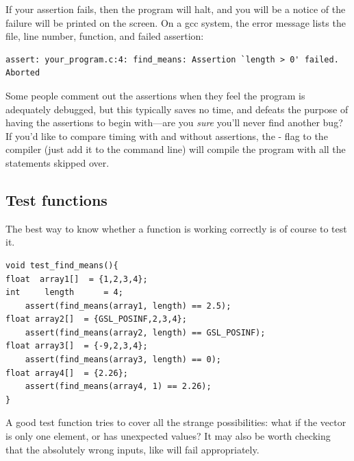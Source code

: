 If your assertion fails, then the program will halt, and you will be
a notice of the failure will be printed on the screen. On a gcc system,
the error message lists the file, line number, function, and failed assertion:
\begin{lstlisting}
assert: your_program.c:4: find_means: Assertion `length > 0' failed.
Aborted
\end{lstlisting}

Some people comment out the assertions when they feel the program is
adequately debugged, but this typically saves no time, and defeats the
purpose of having the assertions to begin with---are you {\em sure}
you'll never find another bug? If you'd like to compare timing with and
without assertions, the - flag to the compiler (just
add it to the command line) will compile the program with all the
 statements skipped over.


\subsection{Test functions} The best way to know whether a
function is working correctly is of course to test it.
\begin{lstlisting}
void test_find_means(){
float  array1[]  = {1,2,3,4};
int     length      = 4;
    assert(find_means(array1, length) == 2.5);
float array2[]  = {GSL_POSINF,2,3,4};
    assert(find_means(array2, length) == GSL_POSINF);
float array3[]  = {-9,2,3,4};
    assert(find_means(array3, length) == 0);
float array4[]  = {2.26};
    assert(find_means(array4, 1) == 2.26);
}
\end{lstlisting}

A good test function tries to cover all the strange possibilities: what
if the vector is only one element, or has unexpected values? It may also
be worth checking that the absolutely wrong inputs, like
 will fail appropriately.

